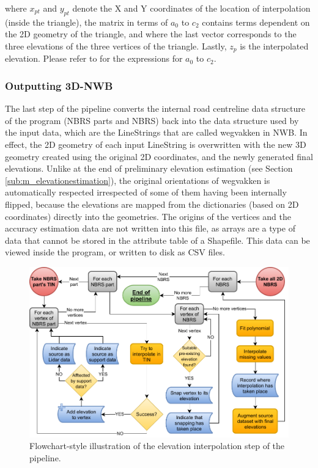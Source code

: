 where $x_{pt}$ and $y_{pt}$ denote the X and Y coordinates of the location of interpolation (inside the triangle), the matrix in terms of $a_{0}$ to $c_{2}$ contains terms dependent on the 2D geometry of the triangle, and where the last vector corresponds to the three elevations of the three vertices of the triangle. Lastly, $z_{p}$ is the interpolated elevation. Please refer to \cite{fan_etal_2014} for the expressions for $a_{0}$ to $c_{2}$.

\subsubsection{Outputting 3D-NWB}

The last step of the pipeline converts the internal road centreline data structure of the program (NBRS parts and NBRS) back into the data structure used by the input data, which are the LineStrings that are called wegvakken in NWB. In effect, the 2D geometry of each input LineString is overwritten with the new 3D geometry created using the original 2D coordinates, and the newly generated final elevations. Unlike at the end of preliminary elevation estimation (see Section \ref{sub:m_elevationestimation}), the original orientations of wegvakken is automatically respected irrespected of some of them having been internally flipped, because the elevations are mapped from the dictionaries (based on 2D coordinates) directly into the geometries. The origins of the vertices and the accuracy estimation data are not written into this file, as arrays are a type of data that cannot be stored in the attribute table of a Shapefile. This data can be viewed inside the program, or written to disk as CSV files.

\begin{figure}
    \centering
    \includegraphics[width=0.9\linewidth]{final_report/figs/elevation_interpolation.pdf}
    \caption{Flowchart-style illustration of the elevation interpolation step of the pipeline.}
    \label{fig:elevationinterpolationflow}
\end{figure}

